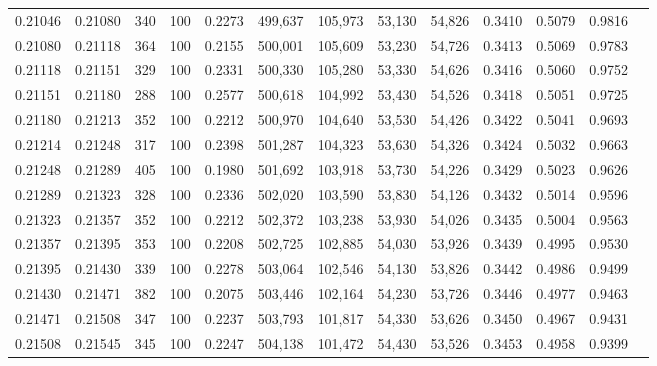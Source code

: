 \begin{tabular}{rrrrrrrrrrrrr}
0.21046 & 0.21080 &   340 & 100 &                                     0.2273 & 499,637 & 105,973 &  53,130 &  54,826 & 0.3410 & 0.5079 & 0.9816 \\
0.21080 & 0.21118 &   364 & 100 &                                     0.2155 & 500,001 & 105,609 &  53,230 &  54,726 & 0.3413 & 0.5069 & 0.9783 \\
0.21118 & 0.21151 &   329 & 100 &                                     0.2331 & 500,330 & 105,280 &  53,330 &  54,626 & 0.3416 & 0.5060 & 0.9752 \\
0.21151 & 0.21180 &   288 & 100 &                                     0.2577 & 500,618 & 104,992 &  53,430 &  54,526 & 0.3418 & 0.5051 & 0.9725 \\
0.21180 & 0.21213 &   352 & 100 &                                     0.2212 & 500,970 & 104,640 &  53,530 &  54,426 & 0.3422 & 0.5041 & 0.9693 \\
0.21214 & 0.21248 &   317 & 100 &                                     0.2398 & 501,287 & 104,323 &  53,630 &  54,326 & 0.3424 & 0.5032 & 0.9663 \\
0.21248 & 0.21289 &   405 & 100 &                                     0.1980 & 501,692 & 103,918 &  53,730 &  54,226 & 0.3429 & 0.5023 & 0.9626 \\
0.21289 & 0.21323 &   328 & 100 &                                     0.2336 & 502,020 & 103,590 &  53,830 &  54,126 & 0.3432 & 0.5014 & 0.9596 \\
0.21323 & 0.21357 &   352 & 100 &                                     0.2212 & 502,372 & 103,238 &  53,930 &  54,026 & 0.3435 & 0.5004 & 0.9563 \\
0.21357 & 0.21395 &   353 & 100 &                                     0.2208 & 502,725 & 102,885 &  54,030 &  53,926 & 0.3439 & 0.4995 & 0.9530 \\
0.21395 & 0.21430 &   339 & 100 &                                     0.2278 & 503,064 & 102,546 &  54,130 &  53,826 & 0.3442 & 0.4986 & 0.9499 \\
0.21430 & 0.21471 &   382 & 100 &                                     0.2075 & 503,446 & 102,164 &  54,230 &  53,726 & 0.3446 & 0.4977 & 0.9463 \\
0.21471 & 0.21508 &   347 & 100 &                                     0.2237 & 503,793 & 101,817 &  54,330 &  53,626 & 0.3450 & 0.4967 & 0.9431 \\
0.21508 & 0.21545 &   345 & 100 &                                     0.2247 & 504,138 & 101,472 &  54,430 &  53,526 & 0.3453 & 0.4958 & 0.9399 \\

\end{tabular}
